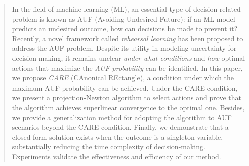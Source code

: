 \documentclass{article}
\theoremstyle{plain}
\theoremstyle{definition}
\begin{document}


\printAffiliationsAndNotice{} 


\begin{abstract}
    In the field of machine learning (ML), an essential type of decision-related problem is known as AUF (Avoiding Undesired Future): if an ML model predicts an undesired outcome, how can decisions be made to prevent it? Recently, a novel framework called \emph{rehearsal learning} has been proposed to address the AUF problem. Despite its utility in modeling uncertainty for decision-making, it remains unclear \textit{under what conditions} and \textit{how} optimal actions that maximize the \emph{AUF probability} can be identified.  
    In this paper, we propose \emph{CARE} (CAnonical REctangle), a condition under which the maximum AUF probability can be achieved. 
    Under the CARE condition, we present a projection-Newton algorithm to select actions and prove that the algorithm achieves superlinear convergence to the optimal one. 
    Besides, we provide a generalization method for adopting the algorithm to AUF scenarios beyond the CARE condition. 
    Finally, we demonstrate that a closed-form solution exists when the outcome is a singleton variable, substantially reducing the time complexity of decision-making. 
    Experiments validate the effectiveness and efficiency of our method.
\end{abstract}
\end{document}

